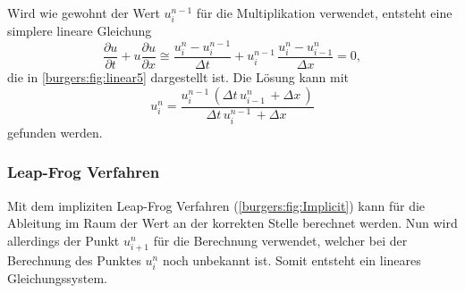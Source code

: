 		Wird wie gewohnt der Wert  $u_{i}^{n-1}$ f\"ur die Multiplikation verwendet, entsteht eine simplere lineare Gleichung
	    \begin{equation}
		\frac {\partial u}{\partial t}+u{\frac {\partial u}{\partial x}} \cong \frac{u_{i}^{n}-u_{i}^{n-1}}{\Delta t}+ u_{i}^{n-1}\, \frac{u_{i}^{n}-u_{i-1}^{n}}{\Delta x}=0,
		\label{burgers:eq:imp_lin}
		\end{equation}
		die in \autoref{burgers:fig:linear5} dargestellt ist.
	    Die L\"osung kann mit
	    \begin{equation}
		 u_{i}^{n} = \frac{u^{n-1}_{i}\, \left(\Delta{t}\, u^{n}_{i-1}\, + \Delta{x}\,\right)}{\Delta{t}\, u^{n-1}_{i}\, + \Delta{x}\,}
		 \label{burgers:eq:imp_lin_sol}
		\end{equation}
	    gefunden werden.

	\subsubsection{Leap-Frog Verfahren}

		Mit dem impliziten Leap-Frog Verfahren (\autoref{burgers:fig:Implicit}) kann f\"ur die Ableitung im Raum der Wert an der korrekten Stelle berechnet werden.
		Nun wird allerdings der Punkt  $u_{i+1}^{n}$ f\"ur die Berechnung verwendet, welcher bei der Berechnung des Punktes  $u_{i}^{n}$ noch unbekannt ist.
		Somit entsteht ein lineares Gleichungssystem.

